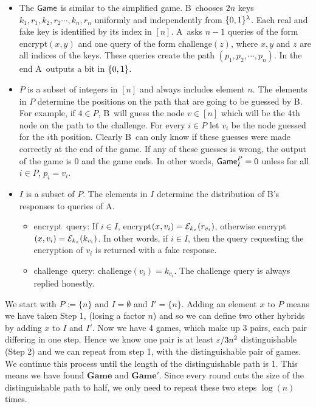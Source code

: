 \documentclass{article}
\def\B{{\sf B}}
\def\A{{\sf A}}
\def\E{{\cal E}}
\newcommand{\encrypt}{{\sf encrypt}}
\newcommand{\game}{{\sf Game}}
\newcommand{\dgame}{{\mathbf{Game}}}
\newcommand{\dgg}[2]{\game_{#1}^{#2}}
\def\challenge{{\sf challenge}}
\begin{document}
\begin{itemize}
\item The $\game$ is similar to the simplified game. \B~chooses $2n$ keys $k_1,r_1,k_2,r_2\cdots,k_n,r_n$ uniformly and independently from $\{0,1\}^\lambda$. Each real and fake key is identified by its index in $[n]$. \A~asks $n-1$ queries of the form \encrypt$(x,y)$ and one query of the form \challenge$(z)$, where $x,y$ and $z$ are all indices of the keys. These queries create the path $(p_1,p_2,\cdots, p_n)$. In the end \A~outputs a bit in $\{0,1\}$.
 
\item $P$ is a subset of integers in $[n]$ and always includes element $n$. The elements in $P$ determine the positions on the path that are going to be guessed by \B. For example, if $4\in P$, \B~will guess the node $v\in [n]$  which will be the 4th node on the path to the challenge. For every $i \in P$ let $v_i$ be the node guessed for the $i$th position. Clearly \B~can only know if these guesses were made correctly at the end of the game. If any of these guesses is wrong, the output of the game is $0$ and the game ends. In other words, $\dgg{I}{P}=0$ unless for all $i\in P$, $p_i=v_i$.

\item $I$ is a subset of $P$. The elements in $I$ determine the distribution of \B's responses to queries of \A.
\begin{itemize}
\item \encrypt~query: If $i\in I$, \encrypt$(x,v_i)=\E_{k_x}(r_{v_i})$, otherwise \encrypt$(x,v_i)=\E_{k_x}(k_{v_i})$. In other words, if $i\in I$, then the query requesting the encryption of $v_i$ is returned with a fake response.
\item \challenge~query: \challenge$(v_i)=k_{v_i}$. The challenge query is always replied honestly. 
\end{itemize}
\end{itemize}

We start with $P:=\{n\}$ and $I=\emptyset$ and $I'=\{n\}$. Adding an element $x$ to $P$ means we have taken Step 1, (losing a factor $n$) and so we can define two other hybrids by adding $x$ to $I$ and $I'$. Now we have 4 games, which make up 3 pairs, each pair differing in one step. Hence we know one pair is at least $\varepsilon/3n^2$ distinguishable (Step 2) and we can repeat from step 1, with the distinguishable pair of games. We continue this process until the length of the distinguishable path is 1. This means we have found $\dgame$ and $\dgame'$. Since every round cuts the size of the distinguishable path to half, we only need to repeat these two steps $\log(n)$ times. 
\end{document}

